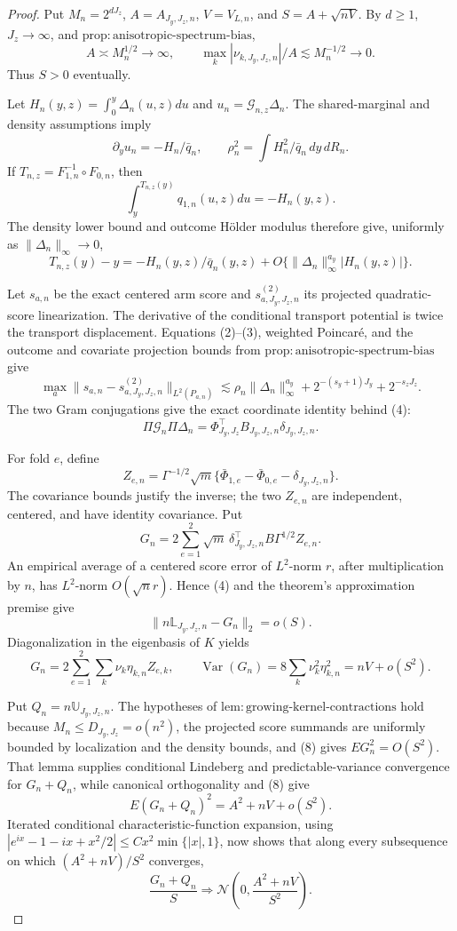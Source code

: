 \documentclass{article}
\begin{document}
\begin{proof}
Put \(M_n=2^{dJ_z}\), \(A=A_{J_y,J_z,n}\), \(V=V_{L,n}\), and \(S=A+\sqrt{nV}\).  By \(d\ge1\), \(J_z\to\infty\), and \(\mathrm{prop{:}anisotropic\text{-}spectrum\text{-}bias}\),
\[
A\asymp M_n^{1/2}\to\infty,
\qquad \max_k|\nu_{k,J_y,J_z,n}|/A\lesssim M_n^{-1/2}\to0. \tag{1}
\]
Thus \(S>0\) eventually.

Let \(H_n(y,z)=\int_0^y\Delta_n(u,z)du\) and \(u_n=\mathcal G_{n,z}\Delta_n\).  The shared-marginal and density assumptions imply
\[
\partial_yu_n=-H_n/\bar q_n,
\qquad \rho_n^2=\int H_n^2/\bar q_n\,dy\,dR_n. \tag{2}
\]
If \(T_{n,z}=F_{1,n}^{-1}\circ F_{0,n}\), then
\[
\int_y^{T_{n,z}(y)}q_{1,n}(u,z)du=-H_n(y,z).
\]
The density lower bound and outcome H\"older modulus therefore give, uniformly as \(\|\Delta_n\|_\infty\to0\),
\[
T_{n,z}(y)-y=-H_n(y,z)/\bar q_n(y,z)
+O\{\|\Delta_n\|_\infty^{a_y}|H_n(y,z)|\}. \tag{3}
\]

Let \(s_{a,n}\) be the exact centered arm score and \(s^{(2)}_{a,J_y,J_z,n}\) its projected quadratic-score linearization.  The derivative of the conditional transport potential is twice the transport displacement.  Equations (2)--(3), weighted Poincar\'e, and the outcome and covariate projection bounds from \(\mathrm{prop{:}anisotropic\text{-}spectrum\text{-}bias}\) give
\[
\max_a\|s_{a,n}-s^{(2)}_{a,J_y,J_z,n}\|_{L^2(P_{a,n})}
\lesssim\rho_n\|\Delta_n\|_\infty^{a_y}
+2^{-(s_y+1)J_y}+2^{-s_zJ_z}. \tag{4}
\]
The two Gram conjugations give the exact coordinate identity behind (4):
\[
\Pi\mathcal G_n\Pi\Delta_n
=\Phi_{J_y,J_z}^{\top}B_{J_y,J_z,n}\delta_{J_y,J_z,n}. \tag{5}
\]

For fold \(e\), define
\[
Z_{e,n}=\Gamma^{-1/2}\sqrt m
\{\bar\Phi_{1,e}-\bar\Phi_{0,e}-\delta_{J_y,J_z,n}\}.
\]
The covariance bounds justify the inverse; the two \(Z_{e,n}\) are independent, centered, and have identity covariance.  Put
\[
G_n=2\sum_{e=1}^2\sqrt m\,
\delta_{J_y,J_z,n}^{\top}B\Gamma^{1/2}Z_{e,n}. \tag{6}
\]
An empirical average of a centered score error of \(L^2\)-norm \(r\), after multiplication by \(n\), has \(L^2\)-norm \(O(\sqrt n r)\).  Hence (4) and the theorem's approximation premise give
\[
\|n\mathbb L_{J_y,J_z,n}-G_n\|_2=o(S). \tag{7}
\]
Diagonalization in the eigenbasis of \(K\) yields
\[
G_n=2\sum_{e=1}^2\sum_k\nu_k\eta_{k,n}Z_{e,k},
\qquad
\operatorname{Var}(G_n)=8\sum_k\nu_k^2\eta_{k,n}^2
=nV+o(S^2). \tag{8}
\]

Put \(Q_n=n\mathbb U_{J_y,J_z,n}\).  The hypotheses of \(\mathrm{lem{:}growing\text{-}kernel\text{-}contractions}\) hold because \(M_n\le D_{J_y,J_z}=o(n^2)\), the projected score summands are uniformly bounded by localization and the density bounds, and (8) gives \(EG_n^2=O(S^2)\).  That lemma supplies conditional Lindeberg and predictable-variance convergence for \(G_n+Q_n\), while canonical orthogonality and (8) give
\[
E(G_n+Q_n)^2=A^2+nV+o(S^2). \tag{9}
\]
Iterated conditional characteristic-function expansion, using
\(|e^{ix}-1-ix+x^2/2|\le Cx^2\min\{|x|,1\}\), now shows that along every subsequence on which \((A^2+nV)/S^2\) converges,
\[
\frac{G_n+Q_n}{S}\Rightarrow
\mathcal N\!\left(0,\frac{A^2+nV}{S^2}\right). \tag{10}
\]


\end{proof}
\end{document}

